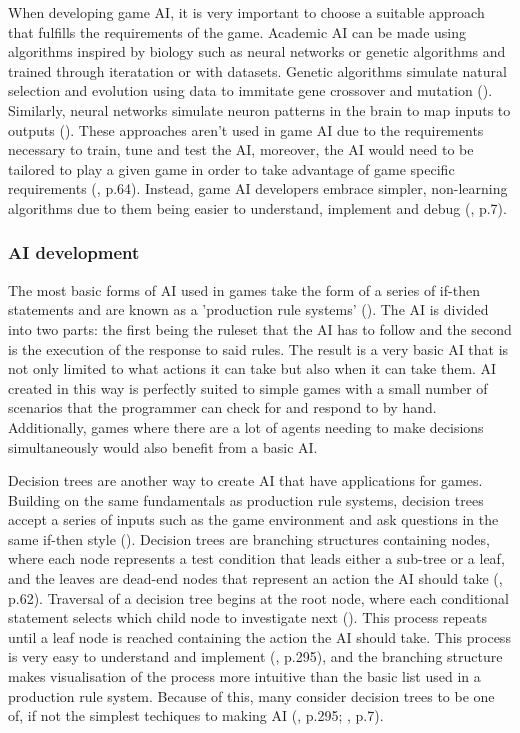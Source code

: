\documentclass[10pt]{article}
\begin{document}
When developing game AI, it is very important to choose a suitable approach that fulfills the requirements of the game. Academic AI can be made using algorithms inspired by biology such as neural networks or genetic algorithms and trained through iteratation or with datasets. Genetic algorithms simulate natural selection and evolution using data to immitate gene crossover and mutation (\cite{tozour2002evolution}). Similarly, neural networks simulate neuron patterns in the brain to map inputs to outputs (\cite{tozour2002evolution}). These approaches aren't used in game AI due to the requirements necessary to train, tune and test the AI, moreover, the AI would need to be tailored to play a given game in order to take advantage of game specific requirements (\cite{nareyek2004ai}, p.64). Instead, game AI developers embrace simpler, non-learning algorithms due to them being easier to understand, implement and debug (\cite{tozour2002evolution}, p.7).

\subsubsection{AI development}

The most basic forms of AI used in games take the form of a series of if-then statements and are known as a 'production rule systems' (\cite{tozour2002evolution}). The AI is divided into two parts: the first being the ruleset that the AI has to follow and the second is the execution of the response to said rules. The result is a very basic AI that is not only limited to what actions it can take but also when it can take them. AI created in this way is perfectly suited to simple games with a small number of scenarios that the programmer can check for and respond to by hand. Additionally, games where there are a lot of agents needing to make decisions simultaneously would also benefit from a basic AI.

Decision trees are another way to create AI that have applications for games. Building on the same fundamentals as production rule systems, decision trees accept a series of inputs such as the game environment and ask questions in the same if-then style (\cite{tozour2002evolution}). Decision trees are branching structures containing nodes, where each node represents a test condition that leads either a sub-tree or a leaf, and the leaves are dead-end nodes that represent an action the AI should take (\cite{nareyek2004ai}, p.62). Traversal of a decision tree begins at the root node, where each conditional statement selects which child node to investigate next (\cite{nareyek2004ai}). This process repeats until a leaf node is reached containing the action the AI should take. This process is very easy to understand and implement (\cite{millington2019ai}, p.295), and the branching structure makes visualisation of the process more intuitive than the basic list used in a production rule system. Because of this, many consider decision trees to be one of, if not the simplest techiques to making AI (\cite{millington2019ai}, p.295; \cite{tozour2002evolution}, p.7).
\end{document}
